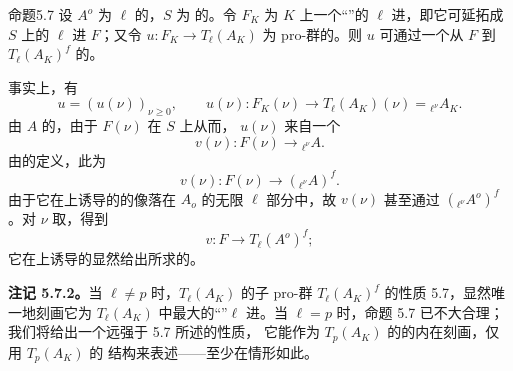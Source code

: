 \begin{SGAresult}{命题}{5.7}
设 $A^o$ 为 $\ell$ 的，$S$ 为  的。令 $F_K$ 为 $K$ 上一个“”的 $\ell$ 进，即它可延拓成 $S$ 上的 $\ell$ 进 $F$；又令 $u:F_K\to T_\ell(A_K)$ 为 pro-群的。则 $u$ 可通过一个从 $F$ 到 $T_\ell(A_K)^f$ 的。
\end{SGAresult}
事实上，有
\[
u=(u(\nu))_{\nu\ge0},\qquad
u(\nu):F_K(\nu)\longrightarrow T_\ell(A_K)(\nu)={}_{\ell^\nu}A_K.\tag{5.7.1}
\]
由 $A$ 的，由于 $F(\nu)$ 在 $S$ 上从而， $u(\nu)$ 来自一个
\[
v(\nu):F(\nu)\longrightarrow{}_{\ell^\nu}A.
\]
由的定义，此为
\[
v(\nu):F(\nu)\longrightarrow({}_{\ell^\nu}A)^f.
\]
由于它在上诱导的的像落在 $A_o$ 的无限 $\ell$ 部分中，故 $v(\nu)$ 甚至通过 $({}_{\ell^\nu}A^o)^f$ 。对 $\nu$ 取，得到
\[
v:F\longrightarrow T_\ell(A^o)^f;
\]
它在上诱导的显然给出所求的。

\textbf{注记 5.7.2。}当 $\ell\ne p$ 时，$T_\ell(A_K)$ 的子 pro-群 $T_\ell(A_K)^f$ 的性质 5.7，显然唯一地刻画它为 $T_\ell(A_K)$ 中最大的“”$\ell$ 进。当 $\ell=p$ 时，命题 5.7 已不大合理；我们将给出一个远强于 5.7 所述的性质，
它能作为 $T_p(A_K)$ 的的内在刻画，仅用 $T_p(A_K)$ 的 结构来表述——至少在情形如此。

